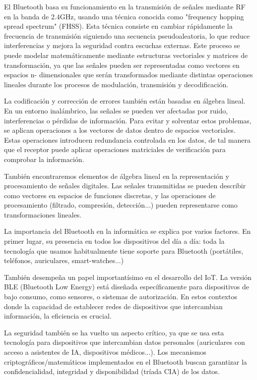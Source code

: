 \documentclass[letterpaper,12pt]{article}
\begin{document}
El Bluetooth basa su funcionamiento en la transmisión de señales mediante RF en la banda de
2.4GHz, usando una técnica conocida como "frequency hopping spread spectrum" (FHSS). Esta
técnica consiste en cambiar rápidamente la frecuencia de transmisión siguiendo una secuencia
pseudoaleatoria, lo que reduce interferencias y mejora la seguridad contra escuchas externas. Este
proceso se puede modelar matemáticamente mediante estructuras vectoriales y matrices de
transformación, ya que las señales pueden ser representadas como vectores en espacios n-
dimensionales que serán transformados mediante distintas operaciones lineales durante los
procesos de modulación, transmisión y decodificación.

La codificación y corrección de errores también están basadas en álgebra lineal. En un entorno
inalámbrico, las señales se pueden ver afectadas por ruido, interferencias o pérdidas de
información. Para evitar y solventar estos problemas, se aplican operaciones a los vectores de datos
dentro de espacios vectoriales. Estas operaciones introducen redundancia controlada en los datos,
de tal manera que el receptor puede aplicar operaciones matriciales de verificación para comprobar
la información.






\newpage
También encontraremos elementos de álgebra lineal en la representación y procesamiento de
señales digitales. Las señales transmitidas se pueden describir como vectores en espacios de
funciones discretas, y las operaciones de procesamiento (filtrado, compresión, detección...) pueden
representarse como transformaciones lineales.




La importancia del Bluetooth en la informática se explica por varios factores. En primer lugar, su
presencia en todos los dispositivos del día a día: toda la tecnología que usamos habitualmente tiene
soporte para Bluetooth (portátiles, teléfonos, auriculares, smart-watches...)

También desempeña un papel importantísimo en el desarrollo del IoT. La versión BLE (Bluetooth
Low Energy) está diseñada específicamente para dispositivos de bajo consumo, como sensores, o
sistemas de autorización. En estos contextos donde la capacidad de establecer redes de dispositivos
que intercambian información, la eficiencia es crucial.

La seguridad también se ha vuelto un aspecto crítico, ya que se usa esta tecnología para
dispositivos que intercambian datos personales (auriculares con acceso a asistentes de IA,
dispositivos médicos...). Los mecanismos criptográficos/matemáticos implementados en el
Bluetooth buscan garantizar la confidencialidad, integridad y disponibilidad (tríada CIA) de los
datos.
\end{document}

